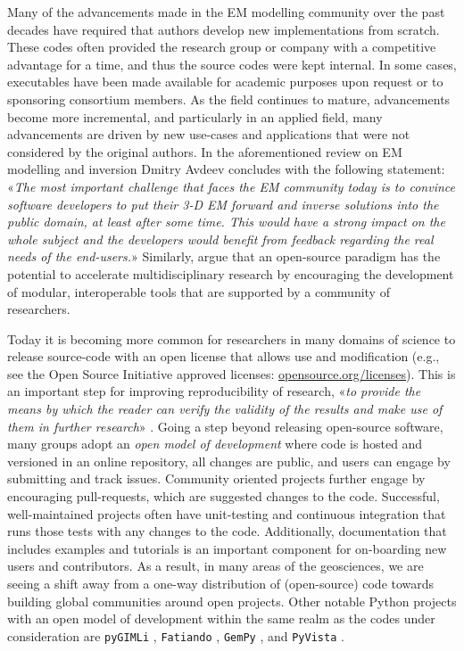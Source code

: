 \documentclass[extra, camera,%
]{gji}
\begin{document}
Many of the advancements made in the EM modelling community over the past decades have required that authors develop new implementations from scratch. These codes often provided the research group or company with a competitive advantage for a time, and thus the source codes were  kept internal. In some cases, executables have been made available for academic purposes upon request or to sponsoring consortium members. As the field continues to mature, advancements become more incremental, and particularly in an applied field, many advancements are driven by new use-cases and applications that were not considered by the original authors. In the aforementioned review on EM modelling and inversion Dmitry Avdeev concludes with the following statement: «\emph{The most important challenge that faces the EM community today is to convince software developers to put their 3-D EM forward and inverse solutions into the public domain, at least after some time. This would have a strong impact on the whole subject and the developers would benefit from feedback regarding the real needs of the end-users.}» Similarly, \cite{EXG.19.Oldenburg} argue that an open-source paradigm has the potential to accelerate multidisciplinary research by encouraging the development of modular, interoperable tools that are supported by a community of researchers.

Today it is becoming more common for researchers in many domains of science to release source-code with an open license that allows use and modification (e.g., see the Open Source Initiative approved licenses: \href{https://opensource.org/licenses}{opensource.org/licenses}). This is an important step for improving reproducibility of research, «\emph{to provide the means by which the reader can verify the validity of the results and make use of them in further research}» \citep{GEO.17.Broggini}. Going a step beyond releasing open-source software, many groups adopt an \emph{open model of development} where code is hosted and versioned in an online repository, all changes are public, and users can engage by submitting and track issues. Community oriented projects further engage by encouraging pull-requests, which are suggested changes to the code. Successful, well-maintained projects often have unit-testing and continuous integration that runs those tests with any changes to the code. Additionally, documentation that includes examples and tutorials is an important component for on-boarding new users and contributors. As a result, in many areas of the geosciences, we are seeing a shift away from a one-way distribution of (open-source) code towards building global communities around open projects. Other notable Python projects with an open model of development within the same realm as the codes under consideration are \texttt{pyGIMLi} \citep{CAG.17.Rucker}, \texttt{Fatiando} \citep{JOSS.18.Uieda}, \texttt{GemPy} \citep{GMD.19.DeLaVarga}, and \texttt{PyVista} \citep{JOSS.19.Sullivan}.
\end{document}
